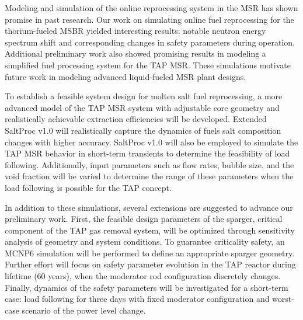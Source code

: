 Modeling and simulation of the online reprocessing system in the \gls{MSR} 
has shown promise in past research. Our work on simulating online fuel  
reprocessing for the thorium-fueled \gls{MSBR} yielded interesting results: 
notable neutron energy spectrum shift and corresponding changes in safety 
parameters during operation. Additional preliminary work also showed promising
results in modeling a simplified fuel processing system for the \gls{TAP} 
\gls{MSR}. These simulations motivate future work in modeling advanced 
liquid-fueled \gls{MSR} plant designs.

To establish a feasible system design for molten salt fuel reprocessing, a 
more advanced model of the \gls{TAP} \gls{MSR} system with adjustable core 
geometry and realistically achievable extraction efficiencies will be 
developed. Extended SaltProc v1.0 will realistically capture the dynamics of 
fuels salt composition changes with higher accuracy. SaltProc v1.0 will also 
be employed to simulate the \gls{TAP} \gls{MSR} behavior in short-term 
transients to determine the feasibility of load following. Additionally, input 
parameters such as flow rates, bubble size, and the void fraction will be 
varied to determine the range of these parameters when the load following is 
possible for the \gls{TAP} concept.

In addition to these simulations, several extensions are suggested to 
advance our preliminary work. First, the feasible design parameters of the 
sparger, critical component of the \gls{TAP} gas removal system, will be 
optimized through sensitivity analysis of geometry and system conditions. To 
guarantee criticality safety, an MCNP6 simulation will be performed to define 
an appropriate sparger geometry. Further effort will focus on safety  
parameter evolution in the \gls{TAP} reactor during lifetime (60 years),  
when the moderator rod configuration discretely changes. Finally, dynamics of 
the safety parameters will be investigated for a short-term case: load 
following for three days with fixed moderator configuration and worst-case 
scenario of the power level change. 

